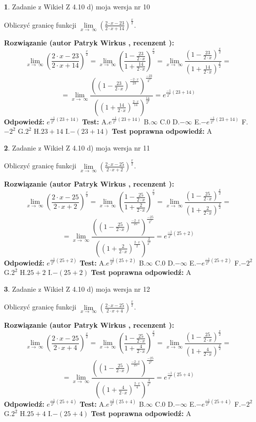 \documentclass[12pt, a4paper]{article}
\theoremstyle{definition} %
\newtheorem{zad}{}
\newcommand{\zadStart}[1]{\begin{zad}#1\newline}
\newcommand{\zadStop}{\end{zad}}
\newcommand{\rozwStart}[2]{\noindent \textbf{Rozwiązanie (autor #1 , recenzent #2): }\newline}
\newcommand{\rozwStop}{\newline}
\newcommand{\odpStart}{\noindent \textbf{Odpowiedź:}\newline}
\newcommand{\odpStop}{\newline}
\newcommand{\testStart}{\noindent \textbf{Test:}\newline}
\newcommand{\testStop}{\newline}
\newcommand{\kluczStart}{\noindent \textbf{Test poprawna odpowiedź:}\newline}
\newcommand{\kluczStop}{\newline}
\begin{document}
\zadStart{Zadanie z Wikieł Z 4.10 d) moja wersja nr 10}


Obliczyć granicę funkcji  $\lim\limits_{x\to\ \infty}(\frac{2\cdot x-23}{2\cdot x+14})^{\frac{x}{2}}$.
\zadStop
\rozwStart{Patryk Wirkus}{}
$$\lim\limits_{x\to\ \infty}(\frac{2\cdot x-23}{2\cdot x+14})^{\frac{x}{2}} = \lim\limits_{x\to\ \infty}(\frac{1-\frac{23}{2\cdot x}}{1+\frac{14}{2\cdot x}})^{\frac{x}{2}}=\lim\limits_{x\to\ \infty}\frac{(1-\frac{23}{2\cdot x})^{\frac{x}{2}}}{(1+\frac{14}{2\cdot x})^{\frac{x}{2}}}=$$
$$=\lim\limits_{x\to\ \infty}\frac{((1-\frac{23}{2\cdot x})^{\frac{-2\cdot x}{23}})^{\frac{-23}{2^{2}}}}{((1+\frac{14}{2\cdot x})^{\frac{2\cdot x}{14}})^{\frac{14}{2^{2}}}}=e^{\frac{-1}{2^{2}}(23+14)}$$
\rozwStop
\odpStart
$e^{\frac{-1}{2^{2}}(23+14)}$
\odpStop
\testStart
A.$e^{\frac{-1}{2^{2}}(23+14)}$ B.$\infty$ C.$0$ D.$-\infty$ E.$-e^{\frac{-1}{2^{2}}(23+14)}$
F.$-2^{2}$ G.$2^{2}$
H.$23+14$
I.$-(23+14)$
\testStop
\kluczStart
A
\kluczStop



\zadStart{Zadanie z Wikieł Z 4.10 d) moja wersja nr 11}


Obliczyć granicę funkcji  $\lim\limits_{x\to\ \infty}(\frac{2\cdot x-25}{2\cdot x+2})^{\frac{x}{2}}$.
\zadStop
\rozwStart{Patryk Wirkus}{}
$$\lim\limits_{x\to\ \infty}(\frac{2\cdot x-25}{2\cdot x+2})^{\frac{x}{2}} = \lim\limits_{x\to\ \infty}(\frac{1-\frac{25}{2\cdot x}}{1+\frac{2}{2\cdot x}})^{\frac{x}{2}}=\lim\limits_{x\to\ \infty}\frac{(1-\frac{25}{2\cdot x})^{\frac{x}{2}}}{(1+\frac{2}{2\cdot x})^{\frac{x}{2}}}=$$
$$=\lim\limits_{x\to\ \infty}\frac{((1-\frac{25}{2\cdot x})^{\frac{-2\cdot x}{25}})^{\frac{-25}{2^{2}}}}{((1+\frac{2}{2\cdot x})^{\frac{2\cdot x}{2}})^{\frac{2}{2^{2}}}}=e^{\frac{-1}{2^{2}}(25+2)}$$
\rozwStop
\odpStart
$e^{\frac{-1}{2^{2}}(25+2)}$
\odpStop
\testStart
A.$e^{\frac{-1}{2^{2}}(25+2)}$ B.$\infty$ C.$0$ D.$-\infty$ E.$-e^{\frac{-1}{2^{2}}(25+2)}$
F.$-2^{2}$ G.$2^{2}$
H.$25+2$
I.$-(25+2)$
\testStop
\kluczStart
A
\kluczStop



\zadStart{Zadanie z Wikieł Z 4.10 d) moja wersja nr 12}


Obliczyć granicę funkcji  $\lim\limits_{x\to\ \infty}(\frac{2\cdot x-25}{2\cdot x+4})^{\frac{x}{2}}$.
\zadStop
\rozwStart{Patryk Wirkus}{}
$$\lim\limits_{x\to\ \infty}(\frac{2\cdot x-25}{2\cdot x+4})^{\frac{x}{2}} = \lim\limits_{x\to\ \infty}(\frac{1-\frac{25}{2\cdot x}}{1+\frac{4}{2\cdot x}})^{\frac{x}{2}}=\lim\limits_{x\to\ \infty}\frac{(1-\frac{25}{2\cdot x})^{\frac{x}{2}}}{(1+\frac{4}{2\cdot x})^{\frac{x}{2}}}=$$
$$=\lim\limits_{x\to\ \infty}\frac{((1-\frac{25}{2\cdot x})^{\frac{-2\cdot x}{25}})^{\frac{-25}{2^{2}}}}{((1+\frac{4}{2\cdot x})^{\frac{2\cdot x}{4}})^{\frac{4}{2^{2}}}}=e^{\frac{-1}{2^{2}}(25+4)}$$
\rozwStop
\odpStart
$e^{\frac{-1}{2^{2}}(25+4)}$
\odpStop
\testStart
A.$e^{\frac{-1}{2^{2}}(25+4)}$ B.$\infty$ C.$0$ D.$-\infty$ E.$-e^{\frac{-1}{2^{2}}(25+4)}$
F.$-2^{2}$ G.$2^{2}$
H.$25+4$
I.$-(25+4)$
\testStop
\kluczStart
A
\kluczStop
\end{document}
